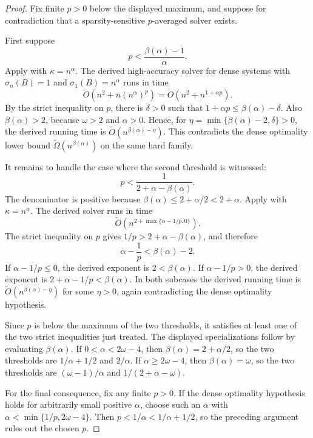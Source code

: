 \documentclass[11pt]{article}
\begin{document}
\begin{proof}
Fix finite $p>0$ below the displayed maximum, and suppose for contradiction
that a sparsity-sensitive $p$-averaged solver exists.

First suppose
\[
  p<\frac{\beta(\alpha)-1}{\alpha}.
\]
Apply  with $\kappa=n^{\alpha}$.  The derived
high-accuracy solver for dense systems with $\sigma_n(B)=1$ and
$\sigma_1(B)=n^{\alpha}$ runs in time
\[
  \widetilde{O}(n^2+n(n^{\alpha})^p)
  =
  \widetilde{O}(n^2+n^{1+\alpha p}).
\]
By the strict inequality on $p$, there is $\delta>0$ such that
$1+\alpha p\leq\beta(\alpha)-\delta$.  Also $\beta(\alpha)>2$, because
$\omega>2$ and $\alpha>0$.  Hence, for
$\eta=\min\{\beta(\alpha)-2,\delta\}>0$, the derived running time is
$\widetilde{O}(n^{\beta(\alpha)-\eta})$.  This contradicts the dense
optimality lower bound $\widetilde{\Omega}(n^{\beta(\alpha)})$ on the same
hard family.

It remains to handle the case where the second threshold is witnessed:
\[
  p<\frac{1}{2+\alpha-\beta(\alpha)}.
\]
The denominator is positive because
$\beta(\alpha)\leq2+\alpha/2<2+\alpha$.  Apply
 with $\kappa=n^{\alpha}$.  The
derived solver runs in time
\[
  \widetilde{O}\left(n^{2+\max\{\alpha-1/p,0\}}\right).
\]
The strict inequality on $p$ gives
$1/p>2+\alpha-\beta(\alpha)$, and therefore
\[
  \alpha-\frac{1}{p}<\beta(\alpha)-2.
\]
If $\alpha-1/p\leq0$, the derived exponent is $2<\beta(\alpha)$.  If
$\alpha-1/p>0$, the derived exponent is
$2+\alpha-1/p<\beta(\alpha)$.  In both subcases the derived running time is
$\widetilde{O}(n^{\beta(\alpha)-\eta})$ for some $\eta>0$, again
contradicting the dense optimality hypothesis.

Since $p$ is below the maximum of the two thresholds, it satisfies at least one
of the two strict inequalities just treated.  The displayed specializations
follow by evaluating $\beta(\alpha)$.  If $0<\alpha<2\omega-4$, then
$\beta(\alpha)=2+\alpha/2$, so the two thresholds are $1/\alpha+1/2$ and
$2/\alpha$.  If $\alpha\geq2\omega-4$, then $\beta(\alpha)=\omega$, so the two
thresholds are $(\omega-1)/\alpha$ and $1/(2+\alpha-\omega)$.

For the final consequence, fix any finite $p>0$.  If the dense optimality
hypothesis holds for arbitrarily small positive $\alpha$, choose such an
$\alpha$ with $\alpha<\min\{1/p,2\omega-4\}$.  Then
$p<1/\alpha<1/\alpha+1/2$, so the preceding argument rules out the chosen
$p$.
\end{proof}
\end{document}
